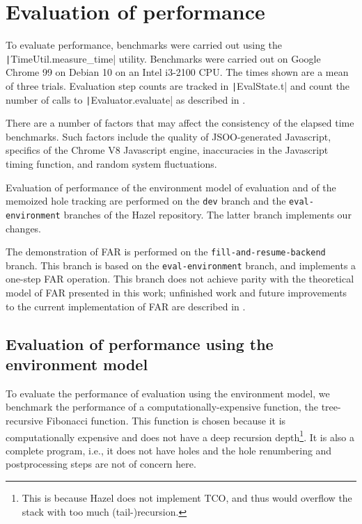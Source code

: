 \chapter{Evaluation of performance}
\label{sec:evaluation}

To evaluate performance, benchmarks were carried out using the \texttt|TimeUtil.measure_time| utility. Benchmarks were carried out on Google Chrome 99 on Debian 10 on an Intel i3-2100 CPU. The times shown are a mean of three trials. Evaluation step counts are tracked in \texttt|EvalState.t| and count the number of calls to \texttt|Evaluator.evaluate| as described in .

There are a number of factors that may affect the consistency of the elapsed time benchmarks. Such factors include the quality of JSOO-generated Javascript, specifics of the Chrome V8 Javascript engine, inaccuracies in the Javascript timing function, and random system fluctuations.

Evaluation of performance of the environment model of evaluation and of the memoized hole tracking are performed on the \texttt{dev} branch and the \texttt{eval-environment} branches of the Hazel repository. The latter branch implements our changes.

The demonstration of FAR is performed on the \texttt{fill-and-resume-backend} branch. This branch is based on the \texttt{eval-environment} branch, and implements a one-step FAR operation. This branch does not achieve parity with the theoretical model of FAR presented in this work; unfinished work and future improvements to the current implementation of FAR are described in .

\section{Evaluation of performance using the environment model}
\label{sec:evaluation-evalenv}

To evaluate the performance of evaluation using the environment model, we benchmark the performance of a computationally-expensive function, the tree-recursive Fibonacci function. This function is chosen because it is computationally expensive and does not have a deep recursion depth\footnote{This is because Hazel does not implement TCO, and thus would overflow the stack with too much (tail-)recursion.}. It is also a complete program, i.e., it does not have holes and the hole renumbering and postprocessing steps are not of concern here.

